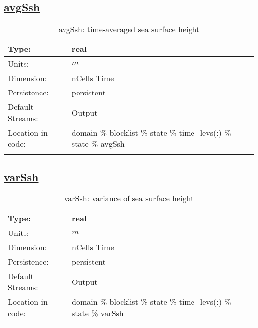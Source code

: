 \subsection[avgSsh]{\hyperref[sec:var_tab_state]{avgSsh}}
\label{subsec:var_sec_state_avgSsh}
\begin{center}
\begin{longtable}{| p{2.0in} | p{4.0in} |}
        \hline 
        Type: & real \\
        \hline 
        Units: & $m$ \\
        \hline 
        Dimension: & nCells Time \\
        \hline 
        Persistence: & persistent \\
        \hline 
		 Default Streams: & Output  \\
        \hline 
		 Location in code: & domain \% blocklist \% state \% time\_levs(:) \% state \% avgSsh \\
		 \hline 
    \caption{avgSsh: time-averaged sea surface height}
\end{longtable}
\end{center}
\subsection[varSsh]{\hyperref[sec:var_tab_state]{varSsh}}
\label{subsec:var_sec_state_varSsh}
\begin{center}
\begin{longtable}{| p{2.0in} | p{4.0in} |}
        \hline 
        Type: & real \\
        \hline 
        Units: & $m$ \\
        \hline 
        Dimension: & nCells Time \\
        \hline 
        Persistence: & persistent \\
        \hline 
		 Default Streams: & Output  \\
        \hline 
		 Location in code: & domain \% blocklist \% state \% time\_levs(:) \% state \% varSsh \\
		 \hline 
    \caption{varSsh: variance of sea surface height}
\end{longtable}
\end{center}
